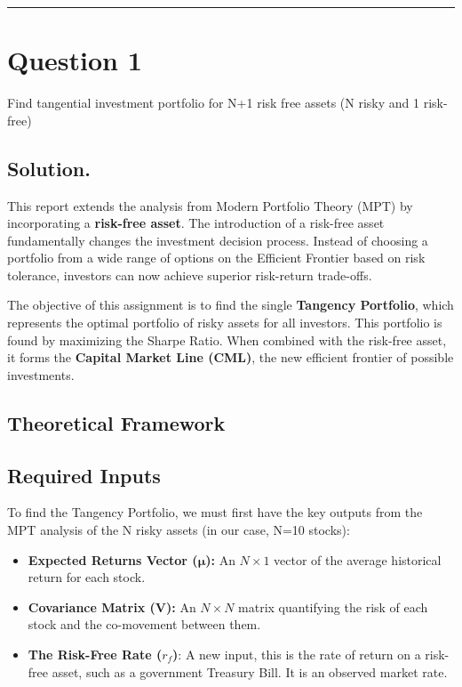\hrule



\section*{Question 1}
Find tangential investment portfolio for N+1 risk free assets (N risky and 1 risk-free)


\subsection*{Solution.}

This report extends the analysis from Modern Portfolio Theory (MPT) by incorporating a \textbf{risk-free asset}. The introduction of a risk-free asset fundamentally changes the investment decision process. Instead of choosing a portfolio from a wide range of options on the Efficient Frontier based on risk tolerance, investors can now achieve superior risk-return trade-offs.

The objective of this assignment is to find the single \textbf{Tangency Portfolio}, which represents the optimal portfolio of risky assets for all investors. This portfolio is found by maximizing the Sharpe Ratio. When combined with the risk-free asset, it forms the \textbf{Capital Market Line (CML)}, the new efficient frontier of possible investments.

\subsection*{Theoretical Framework}

\subsection*{Required Inputs}
To find the Tangency Portfolio, we must first have the key outputs from the MPT analysis of the N risky assets (in our case, N=10 stocks):

\begin{itemize}
    \item \textbf{Expected Returns Vector ($\boldsymbol{\mu}$):} An $N \times 1$ vector of the average historical return for each stock.
    \item \textbf{Covariance Matrix ($\mathbf{V}$):} An $N \times N$ matrix quantifying the risk of each stock and the co-movement between them.
    \item \textbf{The Risk-Free Rate ($r_f$)}: A new input, this is the rate of return on a risk-free asset, such as a government Treasury Bill. It is an observed market rate.
\end{itemize}

